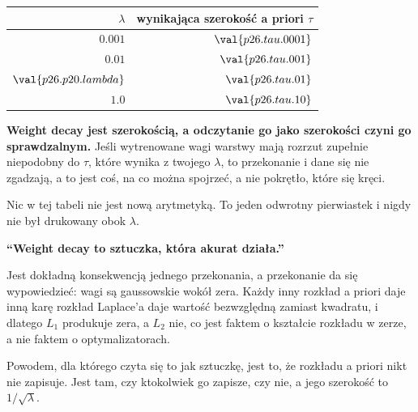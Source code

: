 \begin{fr}

\begin{center}
\begin{tabular}{rr}
\toprule
$\lambda$ & wynikająca szerokość a priori $\tau$ \\
\midrule
$\num{0.001}$ & $\val{p26.tau.0001}$ \\
$\num{0.01}$ & $\val{p26.tau.001}$ \\
$\val{p26.p20.lambda}$ & $\val{p26.tau.01}$ \\
$\num{1.0}$ & $\val{p26.tau.10}$ \\
\bottomrule
\end{tabular}
\end{center}

\textbf{Weight decay jest szerokością, a odczytanie go jako szerokości czyni
go sprawdzalnym.} Jeśli wytrenowane wagi warstwy mają rozrzut zupełnie
niepodobny do $\tau$, które wynika z twojego $\lambda$, to przekonanie i dane
się nie zgadzają, a to jest coś, na co można spojrzeć, a nie pokrętło, które
się kręci.

Nic w tej tabeli nie jest nową arytmetyką. To jeden odwrotny pierwiastek i
nigdy nie był drukowany obok $\lambda$.
\end{fr}

\begin{fr}
\begin{trapbox}
\textbf{\enquote{Weight decay to sztuczka, która akurat działa.}}

Jest dokładną konsekwencją jednego przekonania, a przekonanie da się
wypowiedzieć: wagi są gaussowskie wokół zera. Każdy inny rozkład a priori
daje inną karę \dash{} rozkład Laplace'a daje wartość bezwzględną zamiast
kwadratu, i dlatego $L_1$ produkuje zera, a $L_2$ nie, co jest faktem o
kształcie rozkładu w zerze, a nie faktem o optymalizatorach.

Powodem, dla którego czyta się to jak sztuczkę, jest to, że rozkładu a priori
nikt nie zapisuje. Jest tam, czy ktokolwiek go zapisze, czy nie, a jego
szerokość to $1/\sqrt{\lambda}$.
\end{trapbox}
\end{fr}

